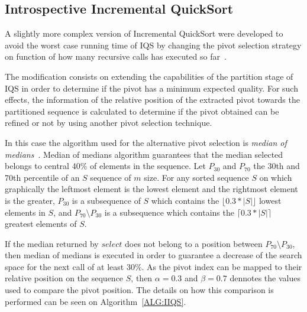 \subsection{Introspective Incremental QuickSort}
\label{SUBSECTION:IIQS}

A slightly more complex version of Incremental QuickSort were developed to avoid the worst case running time of IQS by changing the pivot selection strategy on function of how many recursive calls has executed so far~\cite{7416566}.

The modification consists on extending the capabilities of the partition stage of IQS in order to determine if the pivot has a minimum expected quality. For such effects, the information of the relative position of the extracted pivot towards the partitioned sequence is calculated to determine if the pivot obtained can be refined or not by using another pivot selection technique.

In this case the algorithm used for the alternative pivot selection is \textit{median of medians}~\cite{Blum_Floyd_Pratt_Rivest_Tarjan_1973}. Median of medians algorithm guarantees that the median selected belongs to central 40\% of elements in the sequence. Let $P_{30}$ and $P_{70}$ the 30th and 70th percentile of an $S$ sequence of $m$ size. For any sorted sequence $S$ on which graphically the leftmost element is the lowest element and the rightmost element is the greater, $P_{30}$ is a subsequence of $S$ which contains the $\lfloor0.3*|S|\rfloor$ lowest elements in $S$, and $P_{70} \setminus P_{30}$ is a subsequence which contains the $\lceil0.3*|S|\rceil$ greatest elements of $S$. 

If the median returned by $select$ does not belong to a position between $P_{70} \setminus P_{30}$, then median of medians is executed in order to guarantee a decrease of the search space for the next call of at least 30\%. As the pivot index can be mapped to their relative position on the sequence $S$, then $\alpha=0.3$ and $\beta=0.7$ dennotes the values used to compare the pivot position. The details on how this comparison is performed can be seen on Algorithm~\ref{ALG:IIQS}.

